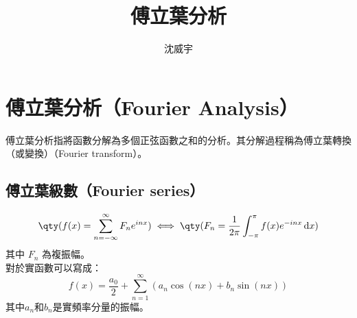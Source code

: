 \documentclass[a4paper,12pt]{article}
\begin{document}
\title{傅立葉分析}
\author{沈威宇}
\date{\temtoday}
\titletocdoc
\section{傅立葉分析（Fourier Analysis）}
傅立葉分析指將函數分解為多個正弦函數之和的分析。其分解過程稱為傅立葉轉換（或變換）（Fourier transform）。
\subsection{傅立葉級數（Fourier series）}
\[\qty(f(x) = \sum_{n=-\infty}^{\infty} F_n e^{inx})\iff\qty(F_n = \frac{1}{2\pi} \int_{-\pi}^{\pi} f(x) e^{-inx} \, \mathrm{d}x)\]
其中 \( F_n \) 為複振幅。\\
對於實函數可以寫成：
\[ f(x)={\frac {a_{0}}{2}}+\sum _{n=1}^{\infty }\left(a_{n}\cos(nx)+b_{n}\sin(nx)\right)\]
其中$a_n$和$b_n$是實頻率分量的振幅。
\end{document}
